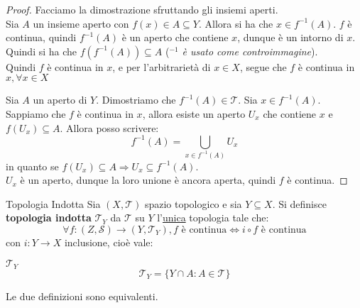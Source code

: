 \documentclass[11pt,a4paper,twoside]{article}
\theoremstyle{definition}
\begin{document}
\begin{proof}
	Facciamo la dimostrazione sfruttando gli insiemi aperti.\\
	\fbox{$\Rightarrow$} Sia $A$ un insieme aperto con $f(x) \in A \subseteq Y$. Allora si ha che $x \in f^{-1}(A)$. $f$ è continua, quindi $f^{-1}(A)$ è un aperto che contiene $x$, dunque è un intorno di $x$.\\Quindi si ha che $f(f^{-1}(A)) \subseteq A$ (${}^{-1}$ \textit{è usato come controimmagine}).\\
	Quindi $f$ è continua in $x$, e per l'arbitrarietà di $x\in X$, segue che $f$ è continua in $x,\forall x \in X$

	\fbox{$\Leftarrow$} Sia $A$ un aperto di $Y$. Dimostriamo che $f^{-1}(A) \in \mathcal T$. Sia $x \in f^{-1}(A)$. Sappiamo che $f$ è continua in $x$, allora esiste un aperto $U_x$ che contiene $x$ e $f(U_x)\subseteq A$. Allora posso scrivere:
	\[ f^{-1}(A) = \bigcup_{x \in f^{-1}(A)}U_x \]
	in quanto se $f(U_x) \subseteq A \Rightarrow U_x \subseteq f^{-1}(A)$. \\
	$U_x$ è un aperto, dunque la loro unione è ancora aperta, quindi $f$ è continua.
\end{proof}

\begin{defn}{Topologia Indotta}{}
	Sia $(X, \mathcal T)$ spazio topologico e sia $Y \subseteq X$. Si definisce \textbf{topologia indotta} $\mathcal T_Y$ da $\mathcal T$ su $Y$ l'\underline{unica} topologia tale che:
	\[\forall f:(Z, \mathcal S) \to (Y, \mathcal T_Y), f\text{ è continua}\Leftrightarrow i\circ f \text{ è continua}\] con $i:Y \to X$ inclusione, cioè vale:

	\begin{center}
	\end{center}
\end{defn}

\begin{defn}{$\mathcal T_Y$}{}
	\[ \mathcal T_Y = \{Y \cap A: A \in \mathcal T\} \]
\end{defn}

\begin{prop}{}{}
	Le due definizioni sono equivalenti.
\end{prop}
\end{document}

